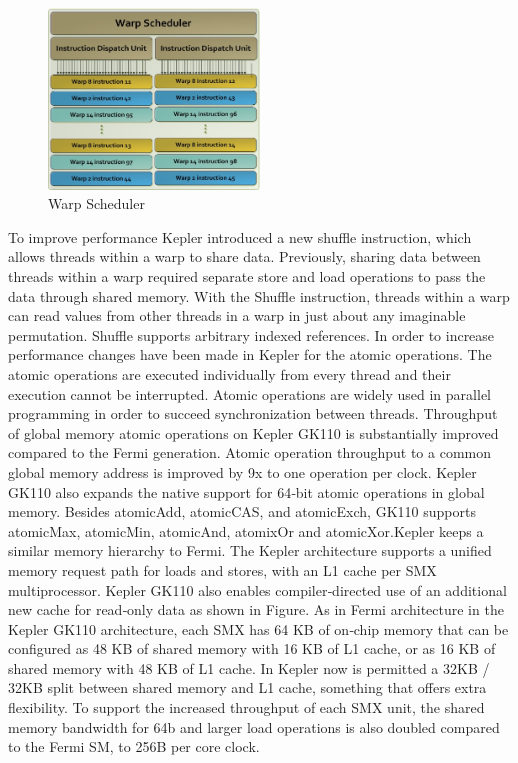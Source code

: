 \begin{figure}[h]
   \centering
       \includegraphics[width=0.5\textwidth]{warp_scheduler}
   \caption{Warp Scheduler}
   \label{fig:warp scheduler}
\end{figure}

To improve performance Kepler introduced a new shuffle instruction, which allows threads within a warp to share data. Previously, sharing data between threads within a warp required separate store and load operations to pass the data through shared memory. With the Shuffle instruction, threads within a warp can read values from other threads in a warp in just about any imaginable permutation. Shuffle supports arbitrary indexed references. In order to increase performance changes have been made in Kepler for the atomic operations. The atomic operations are executed individually from every thread and their execution cannot be interrupted. Atomic operations are widely used in parallel programming in order to succeed synchronization between threads. Throughput of global memory atomic operations on Kepler GK110 is substantially improved compared to the Fermi generation. Atomic operation throughput to a common global memory address is improved by 9x to one operation per clock. Kepler GK110 also expands the native support for 64‐bit atomic operations in global memory. Besides atomicAdd, atomicCAS, and atomicExch, GK110 supports atomicMax, atomicMin, atomicAnd, atomixOr and atomicXor.Kepler keeps a similar memory hierarchy to Fermi. The Kepler architecture supports a unified memory request path for loads and stores, with an L1 cache per SMX multiprocessor. Kepler GK110 also enables compiler‐directed use of an additional new cache for read‐only data as shown in Figure. As in Fermi architecture in the Kepler GK110 architecture, each SMX has 64 KB of on‐chip memory that can be configured as 48 KB of shared memory with 16 KB of L1 cache, or as 16 KB of shared memory with 48 KB of L1 cache. In Kepler now is permitted a 32KB / 32KB split between shared memory and L1 cache, something that offers extra flexibility. To support the increased throughput of each SMX unit, the shared memory bandwidth for 64b and larger load operations is also doubled compared to the Fermi SM, to 256B per core clock.

